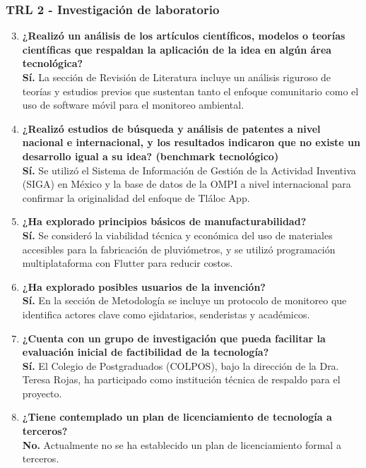 \subsubsection*{TRL 2 - Investigación de laboratorio}
\begin{enumerate}
    \setcounter{enumi}{2}
    \item \textbf{¿Realizó un análisis de los artículos científicos, modelos o teorías científicas que respaldan la aplicación de la idea en algún área tecnológica?} \\ \textbf{Sí.} La sección de Revisión de Literatura incluye un análisis riguroso de teorías y estudios previos que sustentan tanto el enfoque comunitario como el uso de software móvil para el monitoreo ambiental.
    
    \item \textbf{¿Realizó estudios de búsqueda y análisis de patentes a nivel nacional e internacional, y los resultados indicaron que no existe un desarrollo igual a su idea? (benchmark tecnológico)} \\ \textbf{Sí.} Se utilizó el Sistema de Información de Gestión de la Actividad Inventiva (SIGA) en México y la base de datos de la OMPI a nivel internacional para confirmar la originalidad del enfoque de Tláloc App.
    
    \item \textbf{¿Ha explorado principios básicos de manufacturabilidad?} \\ \textbf{Sí.} Se consideró la viabilidad técnica y económica del uso de materiales accesibles para la fabricación de pluviómetros, y se utilizó programación multiplataforma con Flutter para reducir costos.
    
    \item \textbf{¿Ha explorado posibles usuarios de la invención?} \\ \textbf{Sí.} En la sección de Metodología se incluye un protocolo de monitoreo que identifica actores clave como ejidatarios, senderistas y académicos.
    
    \item \textbf{¿Cuenta con un grupo de investigación que pueda facilitar la evaluación inicial de factibilidad de la tecnología?} \\ \textbf{Sí.} El Colegio de Postgraduados (COLPOS), bajo la dirección de la Dra. Teresa Rojas, ha participado como institución técnica de respaldo para el proyecto.
    
    \item \textbf{¿Tiene contemplado un plan de licenciamiento de tecnología a terceros?} \\ \textbf{No.} Actualmente no se ha establecido un plan de licenciamiento formal a terceros.
\end{enumerate}

